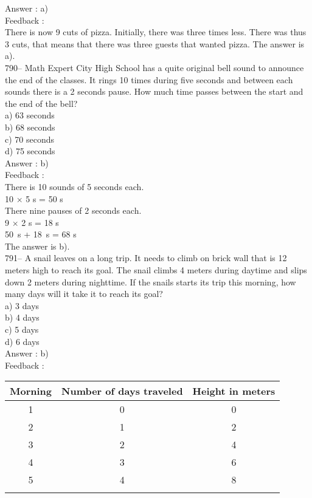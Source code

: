 \documentclass[letterpaper, 12pt]{article}
\begin{document}
Answer : a)\\

Feedback : \\
There is now 9 cuts of pizza.  Initially, there was three times less. There was thus 3 cuts, that means that  there was three guests that wanted pizza.  The answer is a).\\

790-- Math Expert City High School has a quite original bell sound to announce the end of the classes. It rings 10 times during five seconds and between each sounds there is a 2 seconds pause. How much time passes between the start and the end of the bell? \\
a) 63 seconds\\
b) 68 seconds\\
c) 70 seconds\\
d) 75 seconds\\

Answer : b)\\

Feedback : \\
There is 10 sounds of 5 seconds each.\\
10 $\times$ 5 s  = 50 s \\
There nine pauses of 2 seconds each.\\
9 $\times$ 2 s = 18 s \\
50~s + 18~s = 68 s\\
The answer is b).\\

791-- A snail leaves on a long trip. It needs to climb on brick wall that is 12 meters high to reach its goal. The snail climbs 4 meters during daytime and slips down 2 meters during nighttime. If the snails starts its trip this morning, how many days will it take it to reach its goal?\\
a) 3 days\\
b) 4 days\\
c) 5 days\\
d) 6 days\\

Answer : b)\\

Feedback : \\

\begin{tabular}{|c|c|c|} \hline
{\bf Morning} & {\bf Number of days traveled} & {\bf Height in meters} \\
\hline \hline

1 & 0 & 0 \\ \hline
2 & 1 & 2\\ \hline
3 & 2 & 4\\ \hline
4 & 3 & 6\\ \hline
5 & 4 & 8\\ \hline
\multicolumn{3}{c}{}\\

\end{tabular}\\
\end{document}
